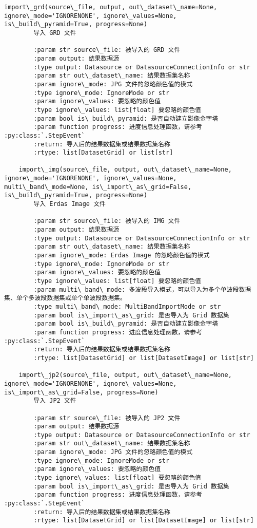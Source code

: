 \documentclass[11pt]{article}
\begin{document}
\begin{Verbatim}[commandchars=\\\{\}]
    import\_grd(source\_file, output, out\_dataset\_name=None, ignore\_mode='IGNORENONE', ignore\_values=None, is\_build\_pyramid=True, progress=None)
        导入 GRD 文件
        
        :param str source\_file: 被导入的 GRD 文件
        :param output: 结果数据源
        :type output: Datasource or DatasourceConnectionInfo or str
        :param str out\_dataset\_name: 结果数据集名称
        :param ignore\_mode: JPG 文件的忽略颜色值的模式
        :type ignore\_mode: IgnoreMode or str
        :param ignore\_values: 要忽略的颜色值
        :type ignore\_values: list[float] 要忽略的颜色值
        :param bool is\_build\_pyramid: 是否自动建立影像金字塔
        :param function progress: 进度信息处理函数，请参考 :py:class:`.StepEvent`
        :return: 导入后的结果数据集或结果数据集名称
        :rtype: list[DatasetGrid] or list[str]
    
    import\_img(source\_file, output, out\_dataset\_name=None, ignore\_mode='IGNORENONE', ignore\_values=None, multi\_band\_mode=None, is\_import\_as\_grid=False, is\_build\_pyramid=True, progress=None)
        导入 Erdas Image 文件
        
        :param str source\_file: 被导入的 IMG 文件
        :param output: 结果数据源
        :type output: Datasource or DatasourceConnectionInfo or str
        :param str out\_dataset\_name: 结果数据集名称
        :param ignore\_mode: Erdas Image 的忽略颜色值的模式
        :type ignore\_mode: IgnoreMode or str
        :param ignore\_values: 要忽略的颜色值
        :type ignore\_values: list[float] 要忽略的颜色值
        :param multi\_band\_mode: 多波段导入模式，可以导入为多个单波段数据集、单个多波段数据集或单个单波段数据集。
        :type multi\_band\_mode: MultiBandImportMode or str
        :param bool is\_import\_as\_grid: 是否导入为 Grid 数据集
        :param bool is\_build\_pyramid: 是否自动建立影像金字塔
        :param function progress: 进度信息处理函数，请参考 :py:class:`.StepEvent`
        :return: 导入后的结果数据集或结果数据集名称
        :rtype: list[DatasetGrid] or list[DatasetImage] or list[str]
    
    import\_jp2(source\_file, output, out\_dataset\_name=None, ignore\_mode='IGNORENONE', ignore\_values=None, is\_import\_as\_grid=False, progress=None)
        导入 JP2 文件
        
        :param str source\_file: 被导入的 JP2 文件
        :param output: 结果数据源
        :type output: Datasource or DatasourceConnectionInfo or str
        :param str out\_dataset\_name: 结果数据集名称
        :param ignore\_mode: JPG 文件的忽略颜色值的模式
        :type ignore\_mode: IgnoreMode or str
        :param ignore\_values: 要忽略的颜色值
        :type ignore\_values: list[float] 要忽略的颜色值
        :param bool is\_import\_as\_grid: 是否导入为 Grid 数据集
        :param function progress: 进度信息处理函数，请参考 :py:class:`.StepEvent`
        :return: 导入后的结果数据集或结果数据集名称
        :rtype: list[DatasetGrid] or list[DatasetImage] or list[str]
    

\end{Verbatim}
\end{document}

